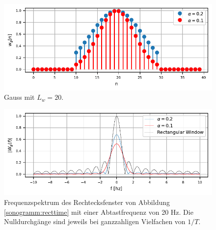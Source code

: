


\begin{figure}
    \centering
    \includegraphics{papers/sonogramm/images/gauss_time.pdf}
    \caption{Gauss mit $L_w = 20$.
    \label{sonogramm:gausstime}
    }
\end{figure}

\begin{figure}
    \centering
    \includegraphics{papers/sonogramm/images/gauss_freq.pdf}
    \caption{Frequenzspektrum des Rechtecksfenster von Abbildung \ref{sonogramm:recttime}
    mit einer Abtastfrequenz von 20 Hz. Die Nulldurchgänge sind jeweils bei ganzzahligen Vielfachen
    von $1/T$.
    \label{sonogramm:gaussfreq}
    }
\end{figure}
